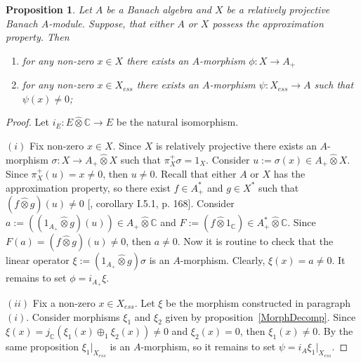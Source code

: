 \documentclass[12pt]{article}
\newtheorem{proposition}[theorem]{Proposition}
\newcommand{\projtens}{\mathbin{\widehat{\otimes}}}
\begin{document}
\begin{proposition}\label{RelProjNecesCond} Let $A$ be a Banach algebra and $X$
    be a relatively projective Banach $A$-module. Suppose, that either $A$ or
    $X$ possess the approximation property. Then
    \begin{enumerate}[label = (\roman*)]
        \item for any non-zero $x\in X$ there exists an $A$-morphism $\phi:X\to
                  A_+$
        \item for any non-zero $x\in X_{ess}$ there exists an $A$-morphism
              $\psi:X_{ess}\to A$ such that $\psi(x)\neq 0$;
    \end{enumerate}
\end{proposition}
\begin{proof} Let $i_E:E\projtens \mathbb{C}\to E$ be the natural isomorphism.

    $(i)$ Fix non-zero $x\in X$. Since $X$ is relatively projective there exists
    an $A$-morphism $\sigma:X\to A_+\projtens X$ such that $\pi_X^+\sigma=1_X$.
    Consider $u:=\sigma(x)\in A_+\projtens X$. Since $\pi_X^+(u)=x\neq 0$, then
    $u\neq 0$. Recall that either $A$ or $X$ has the approximation property, so
    there exist $f\in A_+^*$ and $g\in X^*$ such that $(f\projtens g)(u)\neq 0$
    [\cite{GrothProdTenTopNucl}, corollary I.5.1, p. 168]. Consider
    $a:=((1_{A_+}\projtens g)(u))\in A_+\projtens\mathbb{C}$ and $F:=(f\projtens
        1_{\mathbb{C}})\in A_+^*\projtens\mathbb{C}$. Since $F(a)=(f\projtens
        g)(u)\neq 0$, then $a\neq 0$. Now it is routine to check that the linear
    operator $\xi:=(1_{A_+}\projtens g)\sigma$ is an $A$-morphism. Clearly,
    $\xi(x)=a\neq 0$. It remains to set $\phi=i_{A_+}\xi$.

    $(ii)$ Fix a non-zero $x\in X_{ess}$. Let $\xi$ be the morphism constructed
    in paragraph $(i)$. Consider morphisms $\xi_1$ and $\xi_2$ given by
    proposition~\ref{MorphDecomp}. Since
    $\xi(x)=j_{\mathbb{C}}(\xi_1(x)\oplus_1\xi_2(x))\neq 0$ and $\xi_2(x)=0$,
    then $\xi_1(x)\neq 0$. By the same proposition $\xi_1|_{X_{ess}}$ is an
    $A$-morphism, so it remains to set $\psi=i_A \xi_1|_{X_{ess}}$.

\end{proof}

\end{document}
